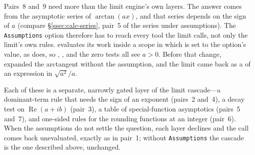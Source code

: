 \begin{codepairs}
\end{codepairs}

Pairs~8 and~9 need more than the limit engine's own layers. The answer comes from
the asymptotic series of \(\arctan(ax)\), and that series depends on the sign of
\(a\) (compare \S\ref{ssec:calc-series}, pair~5 of the series under assumptions).
The \texttt{Assumptions} option therefore has to reach every tool the limit calls,
not only the limit's own rules.  evaluates its work inside a scope in which
 is set to the option's value, as  does, so ,
, and the zero tests all see \(a>0\). Before that change,  expanded
the arctangent without the assumption, and the limit came back as a
 of an expression in \(\sqrt{a^2}/a\).

Each of these is a separate, narrowly gated layer of the limit cascade---a
dominant-term rule that needs the sign of an exponent (pairs~2 and~4), a decay test
on \(\operatorname{Re}(a+ib)\) (pair~3), a table of special-function asymptotics
(pairs~5 and~7), and one-sided rules for the rounding functions at an integer
(pair~6). When the assumptions do not settle the question, each layer declines and
the call comes back unevaluated, exactly as in pair~1; without
\texttt{Assumptions} the cascade is the one described above, unchanged.

